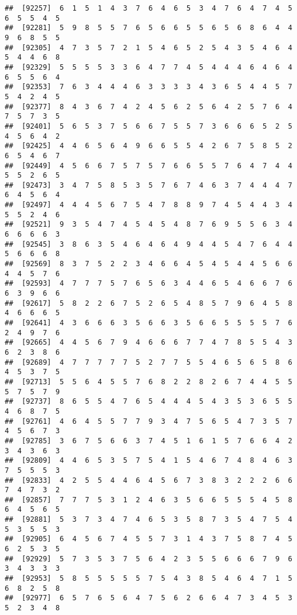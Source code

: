 \documentclass[
]{book}
\begin{document}
\begin{verbatim}
##  [92257]  6  1  5  1  4  3  7  6  4  6  5  3  4  7  6  4  7  4  5  6  5  5  4  5
##  [92281]  5  9  8  5  5  7  6  5  6  6  5  5  6  5  6  8  6  4  4  9  6  8  5  5
##  [92305]  4  7  3  5  7  2  1  5  4  6  5  2  5  4  3  5  4  6  4  5  4  4  6  8
##  [92329]  5  5  5  5  3  3  6  4  7  7  4  5  4  4  4  6  4  6  4  6  5  5  6  4
##  [92353]  7  6  3  4  4  4  6  3  3  3  3  4  3  6  5  4  4  5  7  5  4  2  4  5
##  [92377]  8  4  3  6  7  4  2  4  5  6  2  5  6  4  2  5  7  6  4  7  5  7  3  5
##  [92401]  5  6  5  3  7  5  6  6  7  5  5  7  3  6  6  6  5  2  5  4  5  6  4  2
##  [92425]  4  4  6  5  6  4  9  6  6  5  5  4  2  6  7  5  8  5  2  6  5  4  6  7
##  [92449]  4  5  6  6  7  5  7  5  7  6  6  5  5  7  6  4  7  4  4  5  5  2  6  5
##  [92473]  3  4  7  5  8  5  3  5  7  6  7  4  6  3  7  4  4  4  7  6  4  5  6  4
##  [92497]  4  4  4  5  6  7  5  4  7  8  8  9  7  4  5  4  4  3  4  5  5  2  4  6
##  [92521]  9  3  5  4  7  4  5  4  5  4  8  7  6  9  5  5  6  3  4  6  6  6  6  3
##  [92545]  3  8  6  3  5  4  6  4  6  4  9  4  4  5  4  7  6  4  4  5  6  6  6  8
##  [92569]  8  3  7  5  2  2  3  4  6  6  4  5  4  5  4  4  5  6  6  4  4  5  7  6
##  [92593]  4  7  7  7  5  7  6  5  6  3  4  4  6  5  4  6  6  7  6  6  3  9  6  6
##  [92617]  5  8  2  2  6  7  5  2  6  5  4  8  5  7  9  6  4  5  8  4  6  6  6  5
##  [92641]  4  3  6  6  6  3  5  6  6  3  5  6  6  5  5  5  5  7  6  2  4  9  7  6
##  [92665]  4  4  5  6  7  9  4  6  6  6  7  7  4  7  8  5  5  4  3  6  2  3  8  6
##  [92689]  4  7  7  7  7  7  5  2  7  7  5  5  4  6  5  6  5  8  6  4  5  3  7  5
##  [92713]  5  5  6  4  5  5  7  6  8  2  2  8  2  6  7  4  4  5  5  5  7  5  7  9
##  [92737]  8  6  5  5  4  7  6  5  4  4  4  5  4  3  5  3  6  5  5  4  6  8  7  5
##  [92761]  4  6  4  5  5  7  7  9  3  4  7  5  6  5  4  7  3  5  7  4  5  6  7  3
##  [92785]  3  6  7  5  6  6  3  7  4  5  1  6  1  5  7  6  6  4  2  3  4  3  6  3
##  [92809]  4  4  6  5  3  5  7  5  4  1  5  4  6  7  4  8  4  6  3  7  5  5  5  3
##  [92833]  4  2  5  5  4  4  6  4  5  6  7  3  8  3  2  2  2  6  6  7  4  7  3  2
##  [92857]  7  7  7  5  3  1  2  4  6  3  5  6  6  5  5  5  4  5  8  6  4  5  6  5
##  [92881]  5  3  7  3  4  7  4  6  5  3  5  8  7  3  5  4  7  5  4  5  3  5  5  3
##  [92905]  6  4  5  6  7  4  5  5  7  3  1  4  3  7  5  8  7  4  5  6  2  5  3  5
##  [92929]  5  7  3  5  3  7  5  6  4  2  3  5  5  6  6  6  7  9  6  3  4  3  3  3
##  [92953]  5  8  5  5  5  5  5  7  5  4  3  8  5  4  6  4  7  1  5  6  8  2  5  8
##  [92977]  6  5  7  6  5  6  4  7  5  6  2  6  6  4  7  3  4  5  3  5  2  3  4  8

\end{verbatim}
\end{document}
